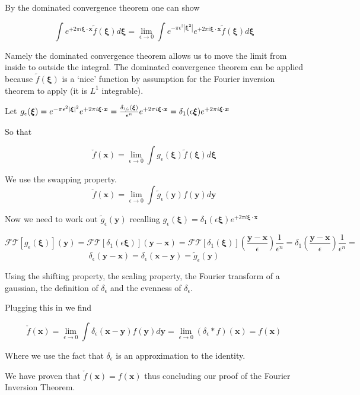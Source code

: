 \documentclass[12pt]{article}
\newcommand{\bv}[1]{\boldsymbol{#1}}
\newcommand{\ep}{\epsilon}
\begin{document}
By the dominated convergence theorem one can show

\[
\int e^{+ 2 \pi i \bv{\xi} \cdot \bv{x}} \tilde{f}(\bv{\xi}) d\bv{\xi} = 
\lim_{\ep\rightarrow 0} \int e^{-\pi \ep^2 |\bv{\xi^2}|} e^{+ 2 \pi i \bv{\xi} \cdot \bv{x}} \tilde{f}(\bv{\xi}) d\bv{\xi}
\]

Namely the dominated convergence theorem allows us to move the limit from inside to outside the integral. The dominated convergence theorem can be applied because $\tilde{f}(\bv{\xi})$ is a `nice' function by assumption for the Fourier inversion theorem to apply (it is $L^1$ integrable).

Let $g_{\ep}(\bv{\xi}) = e^{-\pi \ep^2 |\bv{\xi}|^2} e^{+ 2 \pi i \bv{\xi} \cdot \bv{x}} = 
\frac{\delta_{\sfrac{1}{\ep}}(\bv{\xi})}{\ep^n}e^{+2 \pi i \bv{\xi} \cdot \bv{x}} = \delta_1(\ep \bv{\xi})e^{+2 \pi i \bv{\xi} \cdot \bv{x}} $

So that

\[
\check{f}(\bv{x}) = \lim_{\ep\rightarrow 0} \int g_{\ep}(\bv{\xi}) \tilde{f}(\bv{\xi}) d\bv{\xi}
\]

We use the swapping property.
\[
\check{f}(\bv{x}) = \lim_{\ep\rightarrow 0} \int \tilde{g}_{\ep}(\bv{y})f(\bv{y}) d\bv{y}
\]

Now we need to work out $\tilde{g}_{\ep}(\bv{y})$ recalling $g_{\ep}(\bv{\xi}) = 
\delta_1 (\ep \bv{\xi}) e^{+2 \pi i \bv{\xi} \cdot \bv{x}}$

\[
\mathcal{FT}[g_{\ep}(\bv{\xi})](\bv{y}) = \mathcal{FT}[\delta_1(\ep \bv{\xi})](\bv{y}-\bv{x}) = \mathcal{FT}[\delta_1(\bv{\xi})]\left(\frac{\bv{y}-\bv{x}}{\ep}\right) \frac{1}{\ep^n} = \delta_1\left(\frac{\bv{y}-\bv{x}}{\ep}\right) \frac{1}{\ep^n} = \]
\[
\delta_{\ep}(\bv{y}-\bv{x}) = \delta_{\ep}(\bv{x}-\bv{y}) = \tilde{g}_{\ep}(\bv{y})
\]

Using the shifting property, the scaling property, the Fourier transform of a gaussian, the definition of $\delta_{\ep}$ and the evenness of $\delta_{\ep}$.

Plugging this in we find

\[ \check{f}(\bv{x}) = \lim_{\ep\rightarrow 0} \int \delta_{\ep}(\bv{x}-\bv{y}) f(\bv{y}) d\bv{y} = \lim_{\ep\rightarrow 0} (\delta_{\ep} \ast f)(\bv{x}) = f(\bv{x})\]

Where we use the fact that $\delta_{\ep}$ is an approximation to the identity.

We have proven that $\check{f}(\bv{x}) = f(\bv{x})$ thus concluding our proof of the Fourier Inversion Theorem.
\end{document}
